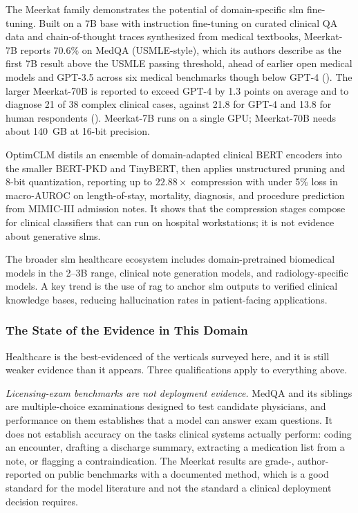 The Meerkat family \citep{kim2025meerkat} demonstrates the potential of domain-specific \gls{slm} fine-tuning. Built on a 7B base with instruction fine-tuning on curated clinical QA data and chain-of-thought traces synthesized from medical textbooks, Meerkat-7B reports 70.6\% on MedQA (USMLE-style), which its authors describe as the first 7B result above the USMLE passing threshold, ahead of earlier open medical models and GPT-3.5 across six medical benchmarks though below GPT-4 (\evC). The larger Meerkat-70B is reported to exceed GPT-4 by 1.3 points on average and to diagnose 21 of 38 complex clinical cases, against 21.8 for GPT-4 and 13.8 for human respondents (\evC). Meerkat-7B runs on a single GPU; Meerkat-70B needs about 140~GB at 16-bit precision.

OptimCLM \citep{hasan2024optimclm} distils an ensemble of domain-adapted clinical BERT encoders into the smaller BERT-PKD and TinyBERT, then applies unstructured pruning and 8-bit quantization, reporting up to $22.88\times$ compression with under 5\% loss in macro-AUROC on length-of-stay, mortality, diagnosis, and procedure prediction from MIMIC-III admission notes. It shows that the compression stages compose for clinical classifiers that can run on hospital workstations; it is not evidence about generative \glspl{slm}.

The broader \gls{slm} healthcare ecosystem includes domain-pretrained biomedical models in the 2--3B range, clinical note generation models, and radiology-specific models. A key trend is the use of \gls{rag} \citep{lewis2020rag} to anchor \gls{slm} outputs to verified clinical knowledge bases, reducing hallucination rates in patient-facing applications.

\subsubsection{The State of the Evidence in This Domain}
\label{subsubsec:applications_health_evidence}

Healthcare is the best-evidenced of the verticals surveyed here, and it is still
weaker evidence than it appears. Three qualifications apply to everything above.

\emph{Licensing-exam benchmarks are not deployment evidence.} MedQA and its
siblings are multiple-choice examinations designed to test candidate physicians,
and performance on them establishes that a model can answer exam questions. It
does not establish accuracy on the tasks clinical systems actually perform:
coding an encounter, drafting a discharge summary, extracting a medication list
from a note, or flagging a contraindication. The Meerkat results are
grade-\evC{}, author-reported on public benchmarks with a documented method,
which is a good standard for the model literature and not the standard a clinical
deployment decision requires.

